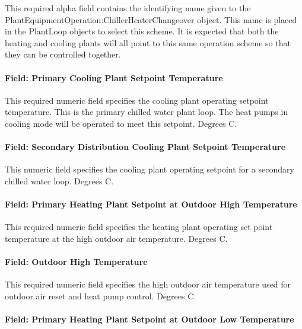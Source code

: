 This required alpha field contains the identifying name given to the PlantEquipmentOperation:ChillerHeaterChangeover object. This name is placed in the PlantLoop objects to select this scheme.  It is expected that both the heating and cooling plants will all point to this same operation scheme so that they can be controlled together. 

\paragraph{Field: Primary Cooling Plant Setpoint Temperature}\label{field-primary-chilled-water-temp-setpoint-plantequipmentoperationchillerheaterchangeover}

This required numeric field specifies the cooling plant operating setpoint temperature.  This is the primary chilled water plant loop.  The heat pumps in cooling mode will be operated to meet this setpoint. Degrees C.

\paragraph{Field: Secondary Distribution Cooling Plant Setpoint Temperature}\label{field-secondary-chilled-water-temp-setpoint-plantequipmentoperationchillerheaterchangeover}

This numeric field specifies the cooling plant operating setpoint for a secondary chilled water loop.  Degrees C. 

\paragraph{Field: Primary Heating Plant Setpoint at Outdoor High Temperature}\label{field-primary-hot-water-temp-setpoint-High-OA-plantequipmentoperationchillerheaterchangeover}

This required numeric field specifies the heating plant operating set point temperature at the high outdoor air temperature. Degrees C.

\paragraph{Field: Outdoor High Temperature}\label{field-hot-water-high-outdoor-air-temp-plantequipmentoperationchillerheaterchangeover}

This required numeric field specifies the high outdoor air temperature used for outdoor air reset and heat pump control.  Degrees C.

\paragraph{Field: Primary Heating Plant Setpoint at Outdoor Low Temperature}\label{field-hot-water-setpoint-reset-max-temp-diff-plantequipmentoperationchillerheaterchangeover}

